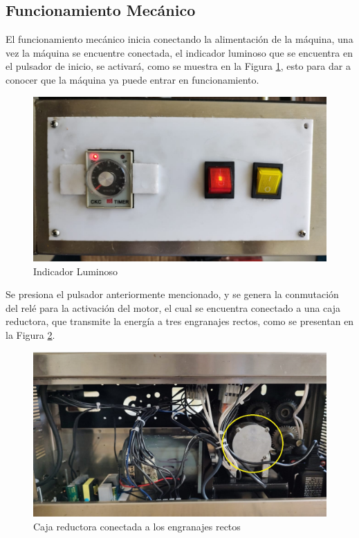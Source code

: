 \subsection{Funcionamiento Mecánico}
El funcionamiento mecánico inicia conectando la alimentación de la máquina, una vez la máquina se encuentre conectada, el indicador luminoso que se encuentra en el pulsador de inicio, se activará, como se muestra en la Figura \ref{fig:indicador}, esto para dar a conocer que la máquina ya puede entrar en funcionamiento.

\begin{figure}[ht]
	\centering
	\includegraphics[angle=270, scale=0.21]{Figs/200.jpg}
	\caption{Indicador Luminoso}
	\label{fig:indicador}
\end{figure}

Se presiona el pulsador anteriormente mencionado, y se genera la conmutación del relé para la activación del motor, el cual se encuentra conectado a una caja reductora, que transmite la energía a tres engranajes rectos, como se presentan en la Figura \ref{fig:caja}.

\newpage		 
\begin{figure}[ht]
	\centering
	\includegraphics[scale=0.13]{Figs/201.jpg}
	\caption{Caja reductora conectada a los engranajes rectos}
	\label{fig:caja}
\end{figure}


